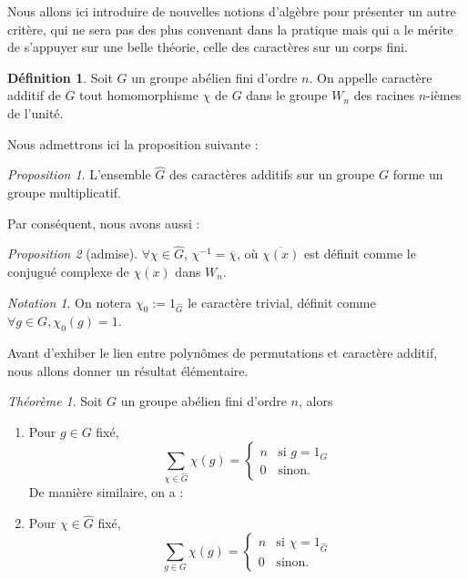 \documentclass[12pt]{article}
\theoremstyle{remark}\newtheorem{note}{Note}
\theoremstyle{remark}\newtheorem{nota}{Notation}
\newtheorem{theorem}{Théorème}
\newtheorem{prop}{Proposition}
\theoremstyle{definition}
\newtheorem{definition}{Définition}
\begin{document}
Nous allons ici introduire de nouvelles notions d'algèbre pour présenter un autre critère, qui ne sera pas des plus convenant dans la pratique mais qui a le mérite de s'appuyer sur une belle théorie, celle des caractères sur un corps fini.

\begin{definition}
Soit $G$ un groupe abélien fini d'ordre $n$. On appelle caractère additif de $G$ tout homomorphisme $\chi$ de $G$ dans le groupe $W_n$ des racines $n$-ièmes de l'unité.
\end{definition}

Nous admettrons ici la proposition suivante :

\begin{prop}
L'ensemble $\hat{G}$ des caractères additifs sur un groupe $G$ forme un groupe multiplicatif.
\end{prop}

Par conséquent, nous avons aussi :

\begin{prop}[admise]
$\forall \chi \in \hat{G}$, $\chi^{-1} = \overline{\chi}$, où $\overline{\chi(x)}$ est définit comme le conjugué complexe de $\chi(x)$ dans $W_n$.
\end{prop}

\begin{nota}
On notera $ \chi_0 := 1_{\hat{G}}$  le caractère trivial, définit comme $\forall g \in G, \chi_0(g) = 1$.
\end{nota}

Avant d'exhiber le lien entre polynômes de permutations et caractère additif, nous allons donner un résultat élémentaire.

\begin{theorem}
Soit $G$ un groupe abélien fini d'ordre $n$, alors
	\begin{enumerate}[label = \roman*)]
		\item Pour $g \in G$ fixé,   
				$$
				\displaystyle\sum_{\chi \in \hat{G}} \chi(g) = \left\{
				    \begin{array}{ll}
				        n & \mbox{si } g = 1_G \\
				        0 & \mbox{sinon.}
				    \end{array}
				\right.
				$$
De manière similaire, on a :
		\item Pour $\chi \in \hat{G}$ fixé,
				$$
				\displaystyle\sum_{g \in G} \chi(g) = \left\{
				    \begin{array}{ll}
				        n & \mbox{si } \chi = 1_{\hat{G}} \\
				        0 & \mbox{sinon.}
				    \end{array}
				\right.
				$$						
	\end{enumerate}
\end{theorem}
\end{document}
